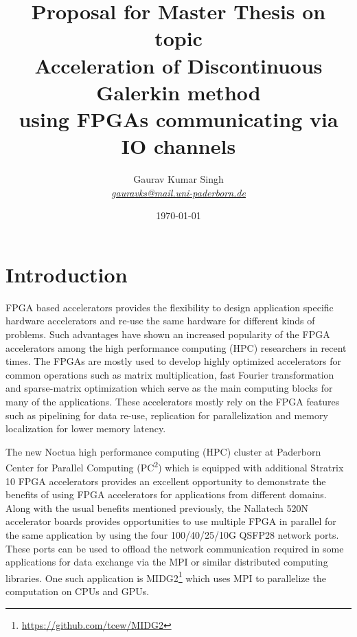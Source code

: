 \documentclass[english,notitlepage]{hgbreport}
\author{Gaurav Kumar Singh \\ \textit{\href{mailto:gauravks@mail.uni-paderborn.de}{gauravks@mail.uni-paderborn.de}}}
\title{Proposal for Master Thesis on topic \\
		Acceleration of Discontinuous Galerkin method \\
		using FPGAs communicating via IO channels}
\date{\today}
\begin{document}
\maketitle

\section{Introduction}

FPGA based accelerators provides the flexibility to design application specific hardware accelerators and re-use the same
hardware for different kinds of problems. Such advantages have shown an increased popularity of the FPGA accelerators among
the high performance computing (HPC) researchers in recent times. The FPGAs are mostly used to develop highly
optimized accelerators for common operations such as matrix multiplication, fast Fourier transformation
and sparse-matrix optimization which serve as the main computing blocks for many of the applications. These accelerators
mostly rely on the FPGA features such as pipelining for data re-use, replication for parallelization and memory localization
for lower memory latency.

The new Noctua high performance computing (HPC) cluster at Paderborn Center for Parallel Computing  (PC\textsuperscript{2})
which is equipped with additional Stratrix 10 FPGA accelerators provides an excellent opportunity to demonstrate the benefits
of using FPGA accelerators for applications from different domains. Along with the usual benefits mentioned previously, the
Nallatech 520N accelerator boards provides opportunities to use multiple FPGA in parallel for the same application by
using the four 100/40/25/10G QSFP28 network ports. These ports can be used to offload the network communication required in
some applications for data exchange via the MPI or similar distributed computing libraries. One such application
is MIDG2\footnote{\url{https://github.com/tcew/MIDG2}} which uses MPI to parallelize the computation on CPUs and GPUs.
\end{document}
